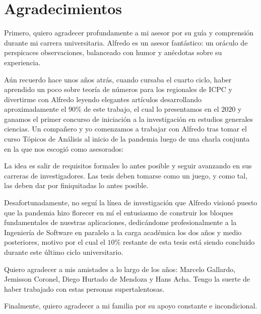 \chapter*{Agradecimientos}
\thispagestyle{empty}

\vspace{-0.5cm}

Primero, quiero agradecer profundamente a mi asesor
por su guía y comprensión durante mi carrera universitaria.
Alfredo es un asesor fantástico:
un oráculo de perspicaces observaciones,
balanceado con humor
y anécdotas sobre su experiencia.

Aún recuerdo hace unos años atrás,
cuando cursaba el cuarto ciclo,
haber aprendido un poco sobre teoría de números
para los regionales de ICPC
y divertirme con Alfredo
leyendo elegantes artículos
desarrollando aproximadamente el \(90\%\) de este trabajo,
el cual lo presentamos en el \(2020\) y ganamos el
primer concurso de iniciación a la investigación en estudios generales ciencias.
Un compa\~nero y yo comenzamos a trabajar con Alfredo
tras tomar el curso Tópicos de Análisis al inicio de la pandemia
luego de una charla conjunta en la que nos escogió como asesorados:

\begin{displayquote}
La idea es salir de requisitos formales lo antes posible
y seguir avanzando en sus carreras de investigadores.
Las tesis deben tomarse como un juego,
y como tal,
las deben dar por finiquitadas lo antes posible.
\end{displayquote}

Desafortunadamente,
no seguí la línea de investigación
que Alfredo visionó
puesto que la pandemia
hizo florecer en mí
el entusiasmo de construir
los bloques fundamentales de nuestras aplicaciones,
dedicándome profesionalmente
a la Ingeniería de Software
en paralelo a la carga académica
los dos años y medio posteriores,
motivo por el cual el \(10\%\) restante de esta tesis
está siendo concluido durante este \'ultimo ciclo universitario.

Quiero agradecer a mis amistades a lo largo de los años:
Marcelo Gallardo,
Jemisson Coronel,
Diego Hurtado de Mendoza
y
Hans Acha.
Tengo la suerte de haber trabajado con estas personas supertalentosas.

Finalmente, quiero agradecer a mi familia por su apoyo constante e incondicional.
